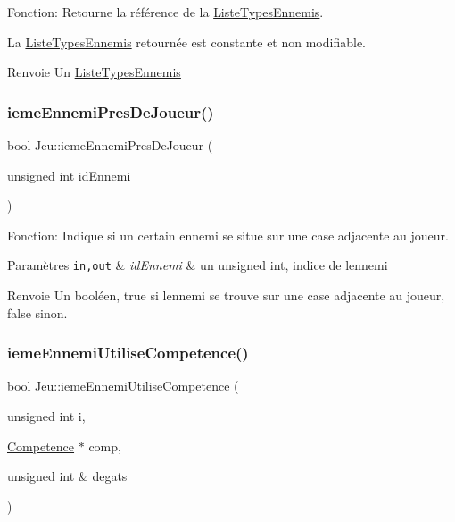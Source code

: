 Fonction\+: Retourne la référence de la \mbox{\hyperlink{structListeTypesEnnemis}{Liste\+Types\+Ennemis}}. 

La \mbox{\hyperlink{structListeTypesEnnemis}{Liste\+Types\+Ennemis}} retournée est constante et non modifiable. \begin{DoxyReturn}{Renvoie}
Un \mbox{\hyperlink{structListeTypesEnnemis}{Liste\+Types\+Ennemis}} 
\end{DoxyReturn}
\mbox{\label{classJeu_a3e6c39f607eed6ee70c96823e0d41415}} 
\subsubsection{\texorpdfstring{ieme\+Ennemi\+Pres\+De\+Joueur()}{iemeEnnemiPresDeJoueur()}}
{\footnotesize\ttfamily bool Jeu\+::ieme\+Ennemi\+Pres\+De\+Joueur (\begin{DoxyParamCaption}\item[{unsigned int}]{id\+Ennemi }\end{DoxyParamCaption})}



Fonction\+: Indique si un certain ennemi se situe sur une case adjacente au joueur. 


\begin{DoxyParams}[1]{Paramètres}
\mbox{\tt in,out}  & {\em id\+Ennemi} & un unsigned int, indice de l\textquotesingle{}ennemi \\
\hline
\end{DoxyParams}
\begin{DoxyReturn}{Renvoie}
Un booléen, true si l\textquotesingle{}ennemi se trouve sur une case adjacente au joueur, false sinon. 
\end{DoxyReturn}
\mbox{\label{classJeu_a9c40989524484aad81e3fa4e8673b45a}} 
\subsubsection{\texorpdfstring{ieme\+Ennemi\+Utilise\+Competence()}{iemeEnnemiUtiliseCompetence()}}
{\footnotesize\ttfamily bool Jeu\+::ieme\+Ennemi\+Utilise\+Competence (\begin{DoxyParamCaption}\item[{unsigned int}]{i,  }\item[{\mbox{\hyperlink{structCompetence}{Competence}} $\ast$}]{comp,  }\item[{unsigned int \&}]{degats }\end{DoxyParamCaption})}



